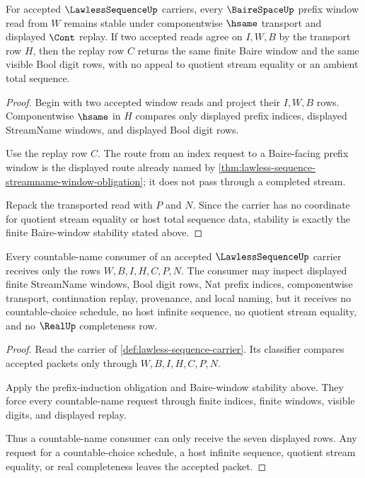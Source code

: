 \begin{theorem}
\label{thm:lawless-sequence-baire-window-stability}
For accepted $\LawlessSequenceUp$ carriers, every $\BaireSpaceUp$ prefix window read from $W$ remains stable under componentwise $\hsame$ transport and displayed $\Cont$ replay. If two accepted reads agree on $I,W,B$ by the transport row $H$, then the replay row $C$ returns the same finite Baire window and the same visible Bool digit rows, with no appeal to quotient stream equality or an ambient total sequence.
\end{theorem}
\begin{proof}
Begin with two accepted window reads and project their $I,W,B$ rows. Componentwise $\hsame$ in $H$ compares only displayed prefix indices, displayed StreamName windows, and displayed Bool digit rows.

Use the replay row $C$. The route from an index request to a Baire-facing prefix window is the displayed route already named by \autoref{thm:lawless-sequence-streamname-window-obligation}; it does not pass through a completed stream.

Repack the transported read with $P$ and $N$. Since the carrier has no coordinate for quotient stream equality or host total sequence data, stability is exactly the finite Baire-window stability stated above.
\end{proof}

\begin{theorem}
\label{thm:lawless-sequence-countable-name-boundary}
Every countable-name consumer of an accepted $\LawlessSequenceUp$ carrier receives only the rows $W,B,I,H,C,P,N$. The consumer may inspect displayed finite StreamName windows, Bool digit rows, Nat prefix indices, componentwise transport, continuation replay, provenance, and local naming, but it receives no countable-choice schedule, no host infinite sequence, no quotient stream equality, and no $\RealUp$ completeness row.
\end{theorem}
\begin{proof}
Read the carrier of \autoref{def:lawless-sequence-carrier}. Its classifier compares accepted packets only through $W,B,I,H,C,P,N$.

Apply the prefix-induction obligation and Baire-window stability above. They force every countable-name request through finite indices, finite windows, visible digits, and displayed replay.

Thus a countable-name consumer can only receive the seven displayed rows. Any request for a countable-choice schedule, a host infinite sequence, quotient stream equality, or real completeness leaves the accepted packet.
\end{proof}

